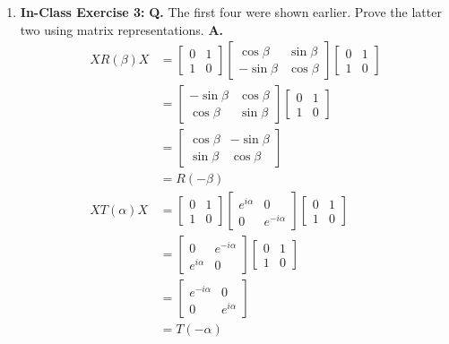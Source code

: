 \documentclass[main.tex]{subfiles}
\begin{document}
\begin{enumerate}
\item[] \textbf{In-Class Exercise 3:} \textbf{Q.} The first four were shown earlier. Prove the latter two using matrix representations. \textbf{A.}
\begin{align*}
    X R(\beta) X    & = \left[\begin{array}{ll}0&1\\1&0\end{array}\right]
                    \left[\begin{array}{ll}\cos\beta&\sin\beta\\-\sin\beta&\cos\beta\end{array}\right]
                    \left[\begin{array}{ll}0&1\\1&0\end{array}\right]\\
                    & = \left[\begin{array}{ll}-\sin\beta&\cos\beta\\\cos\beta&\sin\beta\end{array}\right]
                    \left[\begin{array}{ll}0&1\\1&0\end{array}\right]\\
                    & = \left[\begin{array}{ll}\cos\beta&-\sin\beta\\\sin\beta&\cos\beta\end{array}\right]\\
                    & = R(-\beta) \\
    X T(\alpha) X   & = \left[\begin{array}{ll}0&1\\1&0\end{array}\right]
                    \left[\begin{array}{ll}e^{i\alpha}&0\\0&e^{-i\alpha}\end{array}\right]
                    \left[\begin{array}{ll}0&1\\1&0\end{array}\right]\\
                    & = \left[\begin{array}{ll}0&e^{-i\alpha}\\e^{i\alpha}&0\end{array}\right]
                    \left[\begin{array}{ll}0&1\\1&0\end{array}\right]\\
                    & = \left[\begin{array}{ll}e^{-i\alpha}&0\\0&e^{i\alpha}\end{array}\right]\\ 
                    & = T(-\alpha)
\end{align*}

\end{enumerate}
\end{document}
